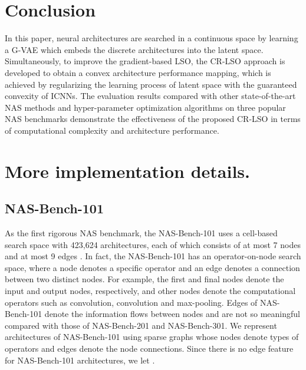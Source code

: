 \documentclass[10pt,twocolumn,letterpaper]{article}
\begin{document}
\section{Conclusion}
In this paper, neural architectures are searched in a continuous space by learning a G-VAE which embeds the discrete architectures into the latent space. Simultaneously, to improve the gradient-based LSO, the CR-LSO approach is developed to obtain a convex architecture performance mapping, which is achieved by regularizing the learning process of latent space with the guaranteed convexity of ICNNs. The evaluation results compared with other state-of-the-art NAS methods and hyper-parameter optimization algorithms on three popular NAS benchmarks demonstrate the effectiveness of the proposed CR-LSO in terms of computational complexity and architecture performance. 

{\small


}

\clearpage
\appendix
\section{More implementation details.}
\label{implementation details}
\subsection{NAS-Bench-101}
As the first rigorous NAS benchmark, the NAS-Bench-101 uses a cell-based search space with 423,624 architectures, each of which consists of at most 7 nodes and at most 9 edges \cite{DBLP:conf/icml/YingKCR0H19}. In fact, the NAS-Bench-101 has an operator-on-node search space, where a node denotes a specific operator and an edge denotes a connection between two distinct nodes. For example, the first and final nodes denote the input and output nodes, respectively, and other nodes denote the computational operators such as  convolution,  convolution and  max-pooling. Edges of NAS-Bench-101 denote the information flows between nodes and are not so meaningful compared with those of NAS-Bench-201 and NAS-Bench-301. We represent architectures of NAS-Bench-101 using sparse graphs \cite{fey2019fast} whose nodes denote types of operators and edges denote the node connections. Since there is no edge feature for NAS-Bench-101 architectures, we let .  
\end{document}
